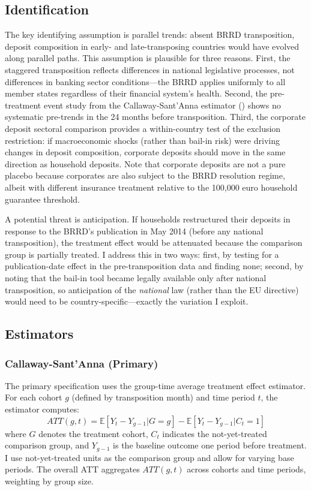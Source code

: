 \documentclass[12pt]{article}
\newcommand{\E}{\mathbb{E}}
\begin{document}
\subsection{Identification}

The key identifying assumption is parallel trends: absent BRRD transposition, deposit composition in early- and late-transposing countries would have evolved along parallel paths. This assumption is plausible for three reasons. First, the staggered transposition reflects differences in national legislative processes, not differences in banking sector conditions---the BRRD applies uniformly to all member states regardless of their financial system's health. Second, the pre-treatment event study from the Callaway-Sant'Anna estimator () shows no systematic pre-trends in the 24 months before transposition. Third, the corporate deposit sectoral comparison provides a within-country test of the exclusion restriction: if macroeconomic shocks (rather than bail-in risk) were driving changes in deposit composition, corporate deposits should move in the same direction as household deposits. Note that corporate deposits are not a pure placebo because corporates are also subject to the BRRD resolution regime, albeit with different insurance treatment relative to the 100{,}000 euro household guarantee threshold.

A potential threat is anticipation. If households restructured their deposits in response to the BRRD's publication in May 2014 (before any national transposition), the treatment effect would be attenuated because the comparison group is partially treated. I address this in two ways: first, by testing for a publication-date effect in the pre-transposition data and finding none; second, by noting that the bail-in tool became legally available only after national transposition, so anticipation of the \textit{national} law (rather than the EU directive) would need to be country-specific---exactly the variation I exploit.

\subsection{Estimators}

\subsubsection{Callaway-Sant'Anna (Primary)}

The primary specification uses the \citet{callaway2021difference} group-time average treatment effect estimator. For each cohort $g$ (defined by transposition month) and time period $t$, the estimator computes:
\begin{equation}
ATT(g,t) = \E\left[Y_t - Y_{g-1} | G = g\right] - \E\left[Y_t - Y_{g-1} | C_t = 1\right]
\end{equation}
where $G$ denotes the treatment cohort, $C_t$ indicates the not-yet-treated comparison group, and $Y_{g-1}$ is the baseline outcome one period before treatment. I use not-yet-treated units as the comparison group and allow for varying base periods. The overall ATT aggregates $ATT(g,t)$ across cohorts and time periods, weighting by group size.
\end{document}
